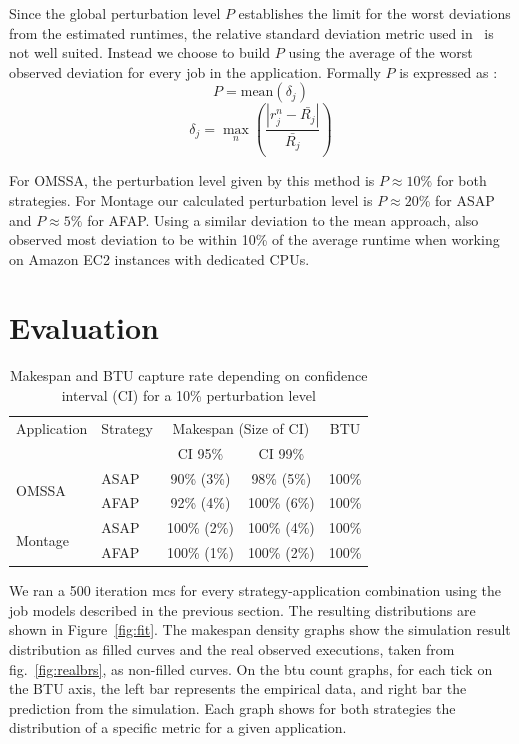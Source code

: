 \documentclass[10pt,conference,compsocconf]{IEEEtran}
\begin{document}
Since the global perturbation level $P$ establishes the limit for the worst
deviations from the estimated runtimes, the relative standard deviation metric
used in~\cite{LeitnerC16} is not well suited. Instead we choose to build $P$
using the average of the worst observed deviation for every job in the
application. Formally $P$ is expressed as :
\begin{equation}
P = \textrm{mean}(\delta{}_j)
\label{eq:P}
\end{equation}
\begin{equation}
\delta{}_j =
\max_n\left(\frac{|r_j^n-\bar{R_j}|}{\bar{R_j}}\right)
\label{eq:d}
\end{equation}

For OMSSA, the perturbation level given by this method is $P\approx{}10\%$ for both
strategies. For Montage  our calculated perturbation level is  $P\approx{}20\%$
for ASAP and $P\approx{}5\%$ for AFAP. Using a similar deviation to the mean
approach, \cite{pics} also observed most deviation to be within 10\% of the
average runtime when working on Amazon EC2 instances with dedicated CPUs.

\section{Evaluation}
\label{sec:eval}

\begin{table}
	\centering
	\caption{Makespan and BTU capture rate depending on confidence interval
          (CI) for a 10\% perturbation level}\label{tab:fit}
	\begin{tabular}{llccc}
		\toprule
		Application&Strategy&\multicolumn{2}{c}{Makespan (Size of CI)}&BTU\\
                           &         & CI 95\% & CI 99\% &\\
		\midrule
		\multirow{2}{*}{OMSSA}&ASAP&  90\% (3\%)&  98\% (5\%)& 100\%\\
				      &AFAP&  92\% (4\%)& 100\% (6\%)& 100\%\\
		\midrule
		\multirow{2}{*}{Montage}&ASAP& 100\% (2\%)& 100\% (4\%)& 100\%\\
					&AFAP& 100\% (1\%)& 100\% (2\%)& 100\%\\
		\bottomrule
	\end{tabular}
\end{table}

We ran a 500 iteration \ac{mcs} for every strategy-application combination using
the job models described in the previous section. The resulting distributions are
shown in Figure~\ref{fig:fit}.  The makespan density graphs  show the simulation
result distribution  as filled  curves and the  real observed  executions, taken
from  fig.~\ref{fig:realbrs},  as  non-filled  curves.  On  the  \ac{btu}  count
graphs, for  each tick on  the BTU axis, the  left bar represents  the empirical
data, and  right bar the prediction  from the simulation.  Each  graph shows for
both strategies the distribution of a specific metric for a given application.
\end{document}
